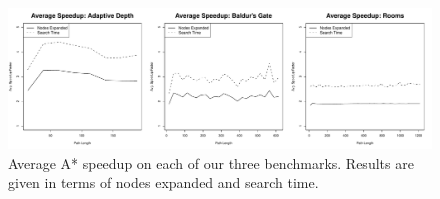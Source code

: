 \begin{figure}[t]
       \begin{center}
                       \includegraphics[width=1.95\columnwidth, trim = 10mm 10mm 10mm 0mm]{diagrams/speedup.pdf}
       \end{center}
       \caption{Average A* speedup on each of our three benchmarks. 
		Results are given in terms of nodes expanded and search time.}
\label{fig-speedup}
\end{figure}
